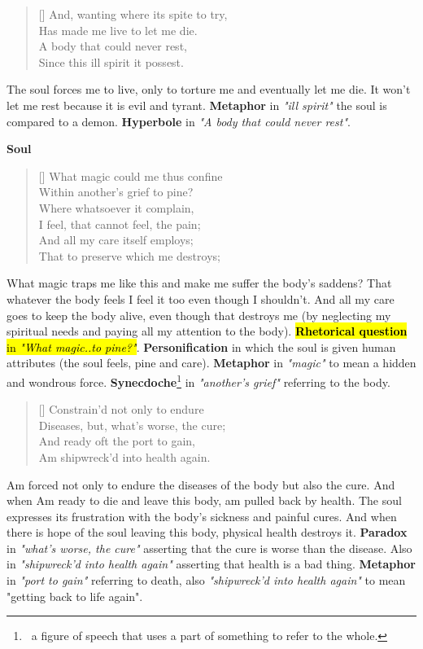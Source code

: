 \documentclass[12pt, a4paper]{article}
\begin{document}
\begin{verse}[\versewidth]
{\fontverse
And, wanting where its spite to try,\\
Has made me live to let me die.\\
A body that could never rest,\\
Since this ill spirit it possest. 
} 
\end{verse}

The soul forces me to live, only to torture me and eventually let me die.
It won't let me rest because it is evil and tyrant. \textbf{Metaphor} in \textit{"ill spirit"} 
the soul is compared to a demon. \textbf{Hyperbole} in \textit{"A body that could never rest"}.
\bigbreak

\centerline{\textbf{\large{Soul}}}
\begin{verse}[\versewidth]
{\fontverse
What magic could me thus confine\\
Within another’s grief to pine?\\
Where whatsoever it complain,\\
I feel, that cannot feel, the pain;\\
And all my care itself employs;\\
That to preserve which me destroys;
} 
\end{verse}

What magic traps me like this and make me suffer the body's saddens? That
whatever the body feels I feel it too even though I shouldn't. And all my 
care goes to keep the body alive, even though that destroys me (by neglecting 
my spiritual needs and paying all my attention to the body). \hl{\textbf{Rhetorical question} in
\textit{"What magic..to pine?"}}. \textbf{Personification} in which the soul is given 
human attributes (the soul feels, pine and care). \textbf{Metaphor} in \textit{"magic"}
to mean a hidden and wondrous force. \textbf{Synecdoche}\footnote{\,
a figure of speech that uses a part of something to refer to the whole.} 
in \textit{"another's grief"} referring to the body.


\begin{verse}[\versewidth]
{\fontverse
Constrain’d not only to endure\\
Diseases, but, what’s worse, the cure;\\
And ready oft the port to gain,\\
Am shipwreck’d into health again. 
} 
\end{verse}

Am forced not only to endure the diseases of the body but also the cure.
And when Am ready to die and leave this body, am pulled back by health.
The soul expresses its frustration with the body's sickness and painful cures.
And when there is hope of the soul leaving this body, physical health destroys it. 
\textbf{Paradox} in \textit{"what's worse, the cure"} asserting that the cure is worse
than the disease. Also in \textit{"shipwreck’d into health again"} asserting that health
is a bad thing. \textbf{Metaphor} in \textit{"port to gain"} referring to death,
also \textit{"shipwreck'd into health again"} to mean "getting back to life again".\bigbreak
\end{document}
